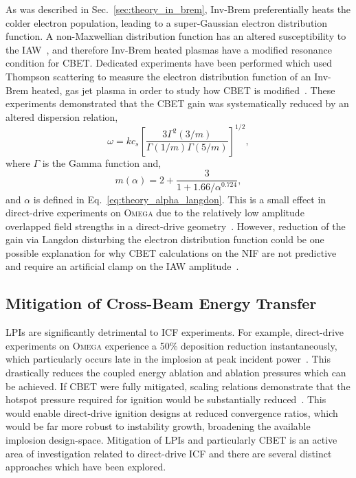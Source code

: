As was described in Sec.~\ref{sec:theory_in_brem}, \ac{Inv-Brem} preferentially heats the colder electron population, leading to a super-Gaussian electron distribution function.
A non-Maxwellian distribution function has an altered susceptibility to the \ac{IAW}~\cite{afeyan_kinetic_1998}, and therefore \ac{Inv-Brem} heated plasmas have a modified resonance condition for \ac{CBET}.
Dedicated experiments have been performed which used Thompson scattering to measure the electron distribution function of an \ac{Inv-Brem} heated, gas jet plasma  in order to study how \ac{CBET} is modified~\cite{turnbull_impact_2020}.
These experiments demonstrated that the \ac{CBET} gain was systematically reduced by an altered dispersion relation,
\begin{equation}
    \omega = k c_s \left[ \frac{3 \Gamma^2(3/m)}{\Gamma(1/m)\Gamma(5/m)} \right]^{1/2},
\end{equation}
where $\Gamma$ is the Gamma function and,
\begin{equation}
    m(\alpha) = 2 + \frac{3}{1 + 1.66/\alpha^{0.724}},
\end{equation}
and $\alpha$ is defined in Eq.~\ref{eq:theory_alpha_langdon}.
This is a small effect in direct-drive experiments on \textsc{Omega} due to the relatively low amplitude overlapped field strengths in a direct-drive geometry~\cite{colaitis_inverse_2021}.
However, reduction of the gain via Langdon disturbing the electron distribution function could be one possible explanation for why \ac{CBET} calculations on the \ac{NIF} are not predictive and require an artificial clamp on the \ac{IAW} amplitude~\cite{michel_stochastic_2012,kritcher_energy_2018}.

\subsection{Mitigation of Cross-Beam Energy Transfer}%
\label{sec:theory_lpi_mitigation}

\ac{LPIs} are significantly detrimental to \ac{ICF} experiments.
For example, direct-drive experiments on \textsc{Omega} experience a 50\% deposition reduction instantaneously, which particularly occurs late in the implosion at peak incident power~\cite{colaitis_inverse_2021}.
This drastically reduces the coupled energy ablation and ablation pressures which can be achieved.
If \ac{CBET} were fully mitigated, scaling relations demonstrate that the hotspot pressure required for ignition would be substantially reduced~\cite{goncharov_national_2017,campbell_laserdirectdrive_2017}.
This would enable direct-drive ignition designs at reduced convergence ratios, which would be far more robust to instability growth, broadening the available implosion design-space.
Mitigation of \ac{LPIs} and particularly \ac{CBET} is an active area of investigation related to direct-drive \ac{ICF} and there are several distinct approaches which have been explored.

